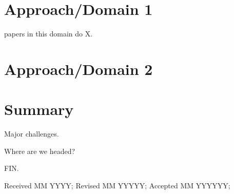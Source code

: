 \documentclass[acmcompsurv,acmnow]{acmtrans2m}
\begin{document}
\section{Approach/Domain 1}
papers in this domain do X.
\section{Approach/Domain 2}

\section{Summary}

Major challenges.

Where are we headed?

FIN.



\begin{received}
Received MM YYYY;
Revised MM YYYYY;
Accepted MM YYYYYY;
\end{received}
\end{document}
